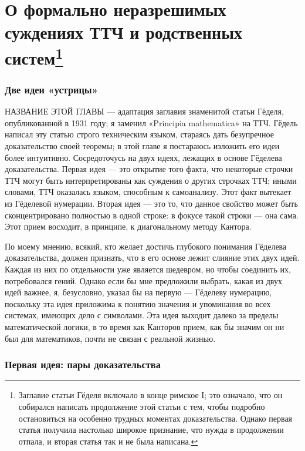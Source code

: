 \documentclass[../main.tex]{subfiles}
\begin{document}
\def\ChapterName{О формально неразрешимых суждениях ТТЧ и родственных систем}
\chapter[\ChapterName]{\ChapterName\texorpdfstring{\footnote{Заглавие статьи Гёделя включало в конце римское I; это означало, что он собирался написать продолжение этой статьи с тем, чтобы подробно остановиться на особенно трудных моментах доказательства. Однако первая статья получила настолько широкое признание, что нужда в продолжении отпала, и вторая статья так и не была написана.}}{}}

\subsection{Две идеи «устрицы»}

НАЗВАНИЕ ЭТОЙ ГЛАВЫ --- адаптация заглавия знаменитой статьи Гёделя, опубликованной в 1931 году; я заменил «Principia mathematica» на ТТЧ\@. Гёдель написал эту статью строго техническим языком, стараясь дать безупречное доказательство своей теоремы; в этой главе я постараюсь изложить его идеи более интуитивно. Сосредоточусь на двух идеях, лежащих в основе Гёделева доказательства. Первая идея --- это открытие того факта, что некоторые строчки ТТЧ могут быть интерпретированы как суждения о других строчках ТТЧ; иными словами, ТТЧ оказалась языком, способным к самоанализу. Этот факт вытекает из Гёделевой нумерации. Вторая идея --- это то, что данное свойство может быть сконцентрировано полностью в одной строке: в фокусе такой строки --- она сама. Этот прием восходит, в принципе, к диагональному методу Кантора.

По моему мнению, всякий, кто желает достичь глубокого понимания Гёделева доказательства, должен признать, что в его основе лежит слияние этих двух идей. Каждая из них по отдельности уже является шедевром, но чтобы соединить их, потребовался гений. Однако если бы мне предложили выбрать, какая из двух идей важнее, я, безусловно, указал бы на первую --- Гёделеву нумерацию, поскольку эта идея приложима к понятию значения и упоминания во всех системах, имеющих дело с символами. Эта идея выходит далеко за пределы математической логики, в то время как Канторов прием, как бы значим он ни был для математиков, почти не связан с реальной жизнью.


\subsection{Первая идея: пары доказательства}
\end{document}
